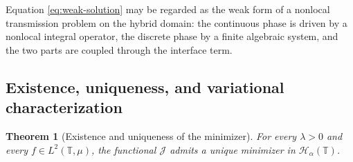 \documentclass[11pt]{article}
\numberwithin{equation}{section}
\newtheorem{theorem}{Theorem}[section]
\theoremstyle{definition}
\newcommand{\T}{\mathbb{T}}
\newcommand{\JJ}{\mathcal{J}}
\newcommand{\HH}{\mathcal{H}}
\begin{document}
Equation \eqref{eq:weak-solution} may be regarded as the weak form of a nonlocal transmission problem on the hybrid domain: the continuous phase is driven by a nonlocal integral operator, the discrete phase by a finite algebraic system, and the two parts are coupled through the interface term.

\subsection{Existence, uniqueness, and variational characterization}

\begin{theorem}[Existence and uniqueness of the minimizer]\label{thm:existence-uniqueness}
For every $\lambda>0$ and every $f\in L^2(\T,\mu)$, the functional $\JJ$ admits a unique minimizer in $\HH_\alpha(\T)$.
\end{theorem}
\end{document}
